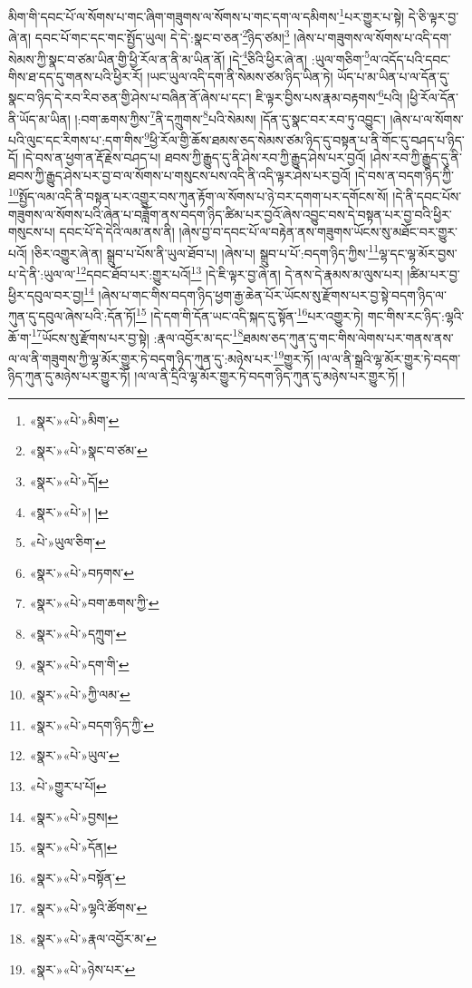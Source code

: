 མིག་གི་དབང་པོ་ལ་སོགས་པ་གང་ཞིག་གཟུགས་ལ་སོགས་པ་གང་དག་ལ་དམིགས་\footnote{«སྣར་»«པེ་»མིག་}པར་གྱུར་པ་སྟེ། དེ་ཅི་ལྟར་བྱ་ཞེ་ན། དབང་པོ་གང་དང་གང་སྤྱོད་ཡུལ། དེ་དེ་:སྣང་བ་ཅན་\footnote{«སྣར་»«པེ་»སྣང་བ་ཙམ་}ཉིད་ཙམ།\footnote{«སྣར་»«པེ་»དོ།} །ཞེས་པ་གཟུགས་ལ་སོགས་པ་འདི་དག་སེམས་ཀྱི་སྣང་བ་ཙམ་ཡིན་གྱི་ཕྱི་རོལ་ན་ནི་མ་ཡིན་ནོ། །དེ་\footnote{«སྣར་»«པེ་»། །}ཅིའི་ཕྱིར་ཞེ་ན། :ཡུལ་གཅིག་\footnote{«པེ་»ཡུལ་ཅིག་}ལ་འདོད་པའི་དབང་གིས་ཐ་དད་དུ་གནས་པའི་ཕྱིར་རོ། །ཡང་ཡུལ་འདི་དག་ནི་སེམས་ཙམ་ཉིད་ཡིན་ཏེ། ཡོད་པ་མ་ཡིན་པ་ལ་དོན་དུ་སྣང་བ་ཉིད་དེ་རབ་རིབ་ཅན་གྱི་ཤེས་པ་བཞིན་ནོ་ཞེས་པ་དང་། ཇི་ལྟར་བྱིས་པས་རྣམ་བརྟགས་\footnote{«སྣར་»«པེ་»བཏགས་}པའི། །ཕྱི་རོལ་དོན་ནི་ཡོད་མ་ཡིན། །:བག་ཆགས་ཀྱིས་\footnote{«སྣར་»«པེ་»བག་ཆགས་ཀྱི་}ནི་དཀྲུགས་\footnote{«སྣར་»«པེ་»དཀྲུག་}པའི་སེམས། །དོན་དུ་སྣང་བར་རབ་ཏུ་འབྱུང་། །ཞེས་པ་ལ་སོགས་པའི་ལུང་དང་རིགས་པ་:དག་གིས་\footnote{«སྣར་»«པེ་»དག་གི་}ཕྱི་རོལ་གྱི་ཆོས་ཐམས་ཅད་སེམས་ཙམ་ཉིད་དུ་བསྟན་པ་ནི་གོང་དུ་བཤད་པ་ཉིད་དོ། །དེ་བས་ན་ཕྱག་ན་རྡོ་རྗེས་བཤད་པ། ཐབས་ཀྱི་རྒྱུད་དུ་ནི་ཤེས་རབ་ཀྱི་རྒྱུད་ཤེས་པར་བྱའོ། །ཤེས་རབ་ཀྱི་རྒྱུད་དུ་ནི་ཐབས་ཀྱི་རྒྱུད་ཤེས་པར་བྱ་བ་ལ་སོགས་པ་གསུངས་པས་འདི་ནི་འདི་ལྟར་ཤེས་པར་བྱའོ། །དེ་བས་ན་བདག་ཉིད་ཀྱི་\footnote{«སྣར་»«པེ་»ཀྱི་ལམ་}སྤྱོད་ལམ་འདི་ནི་བསྟན་པར་འགྱུར་བས་ཀུན་རྟོག་ལ་སོགས་པ་ཉེ་བར་དགག་པར་དགོངས་སོ། །དེ་ནི་དབང་པོས་གཟུགས་ལ་སོགས་པའི་ཞེན་པ་བཟློག་ནས་བདག་ཉིད་ཚིམ་པར་བྱའོ་ཞེས་འབྱུང་བས་དེ་བསྟན་པར་བྱ་བའི་ཕྱིར་གསུངས་པ། དབང་པོ་དེ་དེའི་ལམ་ནས་ནི། །ཞེས་བྱ་བ་དབང་པོ་ལ་བརྟེན་ནས་གཟུགས་ཡོངས་སུ་མཐོང་བར་གྱུར་པའོ། །ཅིར་འགྱུར་ཞེ་ན། སྒྲུབ་པ་པོས་ནི་ཡུལ་ཐོབ་པ། །ཞེས་པ། སྒྲུབ་པ་པོ་:བདག་ཉིད་ཀྱིས་\footnote{«སྣར་»«པེ་»བདག་ཉིད་ཀྱི་}ལྷ་དང་ལྷ་མོར་བྱས་པ་དེ་ནི་:ཡུལ་ལ་\footnote{«སྣར་»«པེ་»ཡུལ་}དབང་ཐོབ་པར་:གྱུར་པའོ།\footnote{«པེ་»གྱུར་པ་པོ།} །དེ་ཇི་ལྟར་བྱ་ཞེ་ན། དེ་ནས་དེ་རྣམས་མ་ལུས་པར། །ཚིམ་པར་བྱ་ཕྱིར་དབུལ་བར་བྱ།\footnote{«སྣར་»«པེ་»བྱས།} །ཞེས་པ་གང་གིས་བདག་ཉིད་ཕྱག་རྒྱ་ཆེན་པོར་ཡོངས་སུ་རྫོགས་པར་བྱ་སྟེ་བདག་ཉིད་ལ་ཀུན་དུ་དབུལ་ཞེས་པའི་:དོན་ཏོ།\footnote{«སྣར་»«པེ་»དོན།} །དེ་དག་གི་དོན་ཡང་འདི་སྐད་དུ་སྟོན་\footnote{«སྣར་»«པེ་»བསྟོན་}པར་འགྱུར་ཏེ། གང་གིས་རང་ཉིད་:ལྷའི་ཆོ་ག་\footnote{«སྣར་»«པེ་»ལྷའི་ཚོགས་}ཡོངས་སུ་རྫོགས་པར་བྱ་སྟེ། :རྣལ་འབྱོར་མ་དང་\footnote{«སྣར་»«པེ་»རྣལ་འབྱོར་མ་}ཐམས་ཅད་ཀུན་དུ་གང་གིས་ལེགས་པར་གནས་ནས་ལ་ལ་ནི་གཟུགས་ཀྱི་ལྷ་མོར་གྱུར་ཏེ་བདག་ཉིད་ཀུན་དུ་:མཉེས་པར་\footnote{«སྣར་»«པེ་»ཉེས་པར་}གྱུར་ཏོ། །ལ་ལ་ནི་སྒྲའི་ལྷ་མོར་གྱུར་ཏེ་བདག་ཉིད་ཀུན་དུ་མཉེས་པར་གྱུར་ཏོ། །ལ་ལ་ནི་དྲིའི་ལྷ་མོར་གྱུར་ཏེ་བདག་ཉིད་ཀུན་དུ་མཉེས་པར་གྱུར་ཏོ། །
